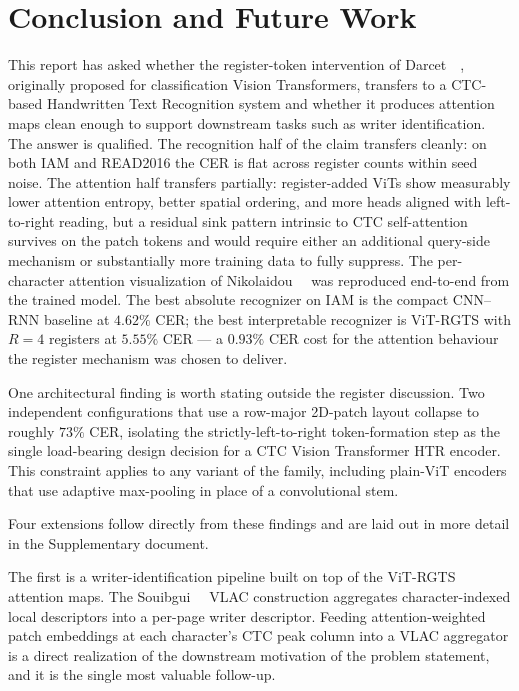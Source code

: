 \section{Conclusion and Future Work}
\label{sec:conclusion}

This report has asked whether the register-token intervention of Darcet~\etal~\cite{darcet2024registers}, originally proposed for classification Vision Transformers, transfers to a CTC-based Handwritten Text Recognition system and whether it produces attention maps clean enough to support downstream tasks such as writer identification. The answer is qualified. The recognition half of the claim transfers cleanly: on both IAM and READ2016 the CER is flat across register counts within seed noise. The attention half transfers partially: register-added ViTs show measurably lower attention entropy, better spatial ordering, and more heads aligned with left-to-right reading, but a residual sink pattern intrinsic to CTC self-attention survives on the patch tokens and would require either an additional query-side mechanism or substantially more training data to fully suppress. The per-character attention visualization of Nikolaidou~\etal~\cite{nikolaidou2024beyondmem} was reproduced end-to-end from the trained model. The best absolute recognizer on IAM is the compact CNN--RNN baseline at $4.62\%$ CER; the best interpretable recognizer is ViT-RGTS with $R = 4$ registers at $5.55\%$ CER --- a $0.93\%$ CER cost for the attention behaviour the register mechanism was chosen to deliver.

One architectural finding is worth stating outside the register discussion. Two independent configurations that use a row-major 2D-patch layout collapse to roughly $73\%$ CER, isolating the strictly-left-to-right token-formation step as the single load-bearing design decision for a CTC Vision Transformer HTR encoder. This constraint applies to any variant of the family, including plain-ViT encoders that use adaptive max-pooling in place of a convolutional stem.

Four extensions follow directly from these findings and are laid out in more detail in the Supplementary document.

The first is a writer-identification pipeline built on top of the ViT-RGTS attention maps. The Souibgui~\etal~\cite{souibgui2022vlac} VLAC construction aggregates character-indexed local descriptors into a per-page writer descriptor. Feeding attention-weighted patch embeddings at each character's CTC peak column into a VLAC aggregator is a direct realization of the downstream motivation of the problem statement, and it is the single most valuable follow-up.

